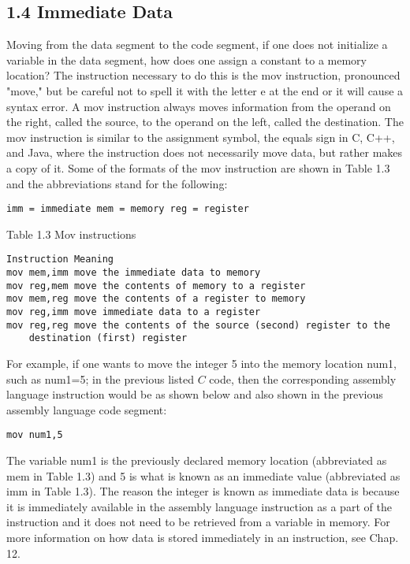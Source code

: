 \documentclass[10pt]{article}
\begin{document}
\subsection*{1.4 Immediate Data}
Moving from the data segment to the code segment, if one does not initialize a variable in the data segment, how does one assign a constant to a memory location? The instruction necessary to do this is the mov instruction, pronounced "move," but be careful not to spell it with the letter e at the end or it will cause a syntax error. A mov instruction always moves information from the operand on the right, called the source, to the operand on the left, called the destination. The mov instruction is similar to the assignment symbol, the equals sign in C, C++, and Java, where the instruction does not necessarily move data, but rather makes a copy of it. Some of the formats of the mov instruction are shown in Table 1.3 and the abbreviations stand for the following:

\begin{verbatim}
imm = immediate mem = memory reg = register
\end{verbatim}

Table 1.3 Mov instructions

\begin{verbatim}
Instruction Meaning
mov mem,imm move the immediate data to memory
mov reg,mem move the contents of memory to a register
mov mem,reg move the contents of a register to memory
mov reg,imm move immediate data to a register
mov reg,reg move the contents of the source (second) register to the
    destination (first) register
\end{verbatim}

For example, if one wants to move the integer 5 into the memory location num1, such as num1=5; in the previous listed $C$ code, then the corresponding assembly language instruction would be as shown below and also shown in the previous assembly language code segment:

\begin{verbatim}
mov num1,5
\end{verbatim}

The variable num1 is the previously declared memory location (abbreviated as mem in Table 1.3) and 5 is what is known as an immediate value (abbreviated as imm in Table 1.3). The reason the integer is known as immediate data is because it is immediately available in the assembly language instruction as a part of the instruction and it does not need to be retrieved from a variable in memory. For more information on how data is stored immediately in an instruction, see Chap. 12.
\end{document}

